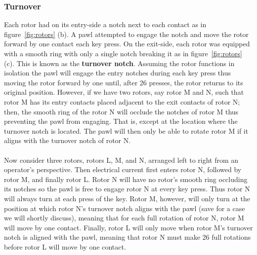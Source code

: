 \subsubsection{Turnover}
Each rotor had on its entry-side a notch next to each contact as in figure~\ref{fig:rotors} (b). A pawl
attempted to engage
the notch and move the rotor forward by one contact each key press.
On the exit-side, each
rotor was equipped with a smooth ring with only a single notch
breaking it as in figure~\ref{fig:rotors} (c). This is known as the {\bf{turnover notch}}. Assuming the
rotor functions in isolation the pawl will engage the entry notches
during each key press thus moving the rotor forward by one until,
after 26 presses, the rotor returns to its original position.
However, if we have two rotors, say rotor M and N, such that rotor M
has its entry contacts placed adjacent to the exit contacts of rotor
N; then, the smooth ring of the rotor N will occlude the notches of
rotor M thus preventing the pawl from engaging. That is, except at
the location where the turnover notch is located. The pawl will then
only be able to rotate rotor M if it aligns with the turnover notch of rotor N.
\\\\Now consider three rotors, rotors L, M, and N, arranged left to
right from an operator's perspective. Then electrical current first
enters rotor N, followed by rotor M, and finally rotor L. Rotor N
will have no rotor's smooth ring occluding its notches so the pawl is
free to engage rotor N at every key press. Thus rotor N will always
turn at each press of the key. Rotor M, however, will only turn at
the position at which rotor N's turnover notch aligns with the pawl
(save for a case we will shortly discuss),
meaning that for each full rotation of rotor N, rotor M will move
by one contact. Finally, rotor L will only move when rotor M's
turnover notch is aligned with the pawl, meaning that rotor N must make 26 full rotations before rotor L will move by one contact.

